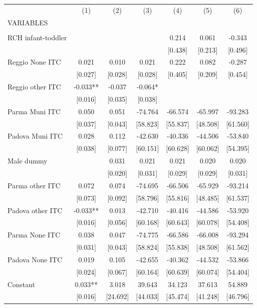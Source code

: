 \begin{tabular}{lcccccc} \hline
 & (1) & (2) & (3) & (4) & (5) & (6) \\
VARIABLES &  &  &  &  &  &  \\ \hline
 &  &  &  &  &  &  \\
RCH infant-toddler &  &  &  & 0.214 & 0.061 & -0.343 \\
 &  &  &  & [0.438] & [0.213] & [0.496] \\
Reggio None ITC & 0.021 & 0.010 & 0.021 & 0.222 & 0.082 & -0.287 \\
 & [0.027] & [0.028] & [0.028] & [0.405] & [0.209] & [0.454] \\
Reggio other ITC & -0.033** & -0.037 & -0.064* &  &  &  \\
 & [0.016] & [0.035] & [0.038] &  &  &  \\
Parma Muni ITC & 0.050 & 0.051 & -74.764 & -66.574 & -65.997 & -93.283 \\
 & [0.037] & [0.043] & [58.823] & [55.837] & [48.508] & [61.560] \\
Padova Muni ITC & 0.028 & 0.112 & -42.630 & -40.336 & -44.506 & -53.840 \\
 & [0.038] & [0.077] & [60.151] & [60.628] & [60.062] & [54.395] \\
Male dummy &  & 0.031 & 0.021 & 0.021 & 0.020 & 0.020 \\
 &  & [0.020] & [0.031] & [0.029] & [0.029] & [0.031] \\
Parma other ITC & 0.072 & 0.074 & -74.695 & -66.506 & -65.929 & -93.214 \\
 & [0.073] & [0.092] & [58.796] & [55.816] & [48.485] & [61.537] \\
Padova other ITC & -0.033** & 0.013 & -42.710 & -40.416 & -44.586 & -53.920 \\
 & [0.016] & [0.056] & [60.168] & [60.643] & [60.078] & [54.408] \\
Parma None ITC & 0.038 & 0.047 & -74.775 & -66.586 & -66.008 & -93.294 \\
 & [0.031] & [0.043] & [58.824] & [55.838] & [48.508] & [61.562] \\
Padova None ITC & 0.019 & 0.105 & -42.655 & -40.362 & -44.532 & -53.866 \\
 & [0.024] & [0.067] & [60.164] & [60.639] & [60.074] & [54.404] \\
Constant & 0.033** & 3.018 & 39.643 & 34.123 & 37.613 & 54.889 \\
 & [0.016] & [24.692] & [44.033] & [45.474] & [41.248] & [46.796] \\

\end{tabular}
